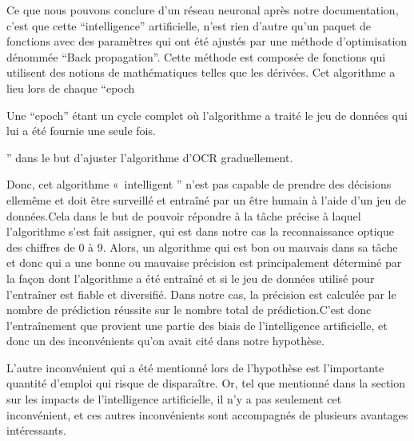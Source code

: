 \documentclass[letterpaper,10pt,french]{sphinxmanual}
\begin{document}
Ce que nous pouvons conclure d’un réseau neuronal après notre documentation,
c’est que cette “intelligence” artificielle, n’est rien d’autre qu’un paquet
de fonctions avec des paramètres qui ont été ajustés par une méthode d’optimisation
dénommée “Back propagation”. Cette méthode est composée de fonctions qui
utilisent des notions de mathématiques telles que les dérivées. Cet algorithme
a lieu lors de chaque “epoch%
\begin{footnote}[2]\sphinxAtStartFootnote
Une “epoch” étant un cycle complet où l’algorithme a traité
le jeu de données qui lui a été fournie une seule fois.
%
\end{footnote}” dans le but d’ajuster l’algorithme d’OCR
graduellement.

Donc, cet algorithme « intelligent ” n’est pas capable de prendre des
décisions elle\sphinxhyphen{}même et doit être surveillé et entraîné par un être humain
à l’aide d’un jeu de données.Cela dans le but de pouvoir répondre à la tâche
précise à la\sphinxhyphen{}quel l’algorithme s’est fait assigner, qui est dans notre
cas la reconnaissance optique des chiffres de 0 à 9. Alors, un algorithme
qui est bon ou mauvais dans sa tâche et donc qui a une bonne ou mauvaise
précision est principalement déterminé par la façon dont l’algorithme a
été entraîné et si le jeu de données utilisé pour l’entraîner est fiable
et diversifié. Dans notre cas, la précision est calculée par le nombre de
prédiction réussite sur le nombre total de prédiction.C’est donc l’entraînement
que provient une partie des biais de l’intelligence artificielle, et donc
un des inconvénients qu’on avait cité dans notre hypothèse.

L’autre inconvénient qui a été mentionné lors de l’hypothèse est l’importante
quantité d’emploi qui risque de disparaître. Or, tel que mentionné dans la
section sur les impacts de l’intelligence artificielle, il n’y a pas seulement
cet inconvénient, et ces autres inconvénients sont accompagnés de plusieurs
avantages intéressants.
\end{document}

